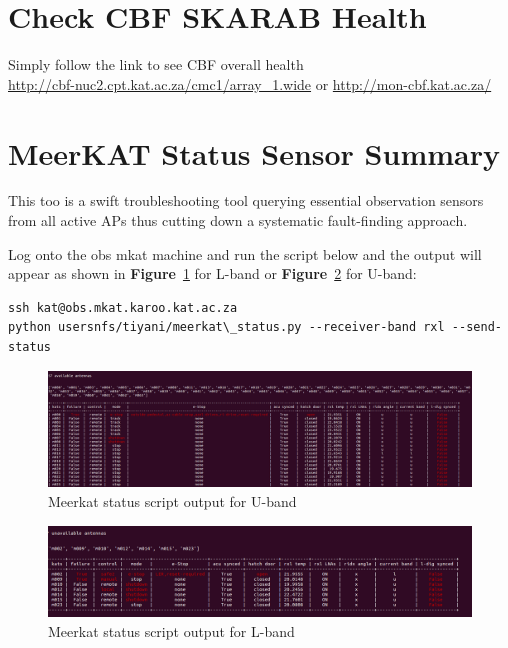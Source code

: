 
\section{ Check CBF SKARAB Health}

Simply follow the link to see CBF overall health\\ \url{http://cbf-nuc2.cpt.kat.ac.za/cmc1/array\_1.wide} or \url{http://mon-cbf.kat.ac.za/}

\section{ MeerKAT Status Sensor Summary}
This too is a swift troubleshooting tool querying essential observation sensors from all active APs thus cutting down a systematic fault-finding approach.   

Log onto the obs mkat machine and run the script below and the output will appear  as shown in \textbf{Figure}~\ref{fig:image78} for L-band or \textbf{Figure}~\ref{fig:image107} for U-band:
\begin{lstlisting}[style=DOS]
ssh kat@obs.mkat.karoo.kat.ac.za
python usersnfs/tiyani/meerkat\_status.py --receiver-band rxl --send-status   

\end{lstlisting}


\begin{figure}[!thb]
	\centering
	\includegraphics[scale=0.18]{Chapters/images/image78.png}
	
	\caption{Meerkat status script  output for U-band}
	\label{fig:image78}
\end{figure}



\begin{figure}[!thb]
	\centering
	\includegraphics[scale=0.23]{Chapters/images/image107.png}
	
	\caption{Meerkat status script  output for L-band}
	\label{fig:image107}
\end{figure}

